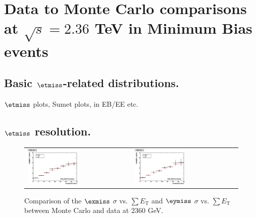 \section{Data to Monte Carlo comparisons at $\sqrt{s}=2.36$ TeV in
  Minimum Bias events}
\label{sc:DataVsMCMB2360}

\subsection{Basic $\etmiss$-related distributions.}
$\etmiss$ plots, Sumet plots, in EB/EE etc.

\clearpage

\subsection{$\etmiss$ resolution.}

\begin{figure}[h!]
 \centering
 \begin{tabular}{ll}
  \includegraphics[width=0.5\textwidth]{plots_DataVsMC_MB_2360GeV/h_metxsigma_sumet_2360.eps} &
  \includegraphics[width=0.5\textwidth]{plots_DataVsMC_MB_2360GeV/h_metysigma_sumet_2360.eps} \\
 \end{tabular}
 \caption{\small Comparison of the $\exmiss$ $\sigma$ vs. $\sum E_\text{T}$ and $\eymiss$ $\sigma$ vs. $\sum E_\text{T}$ between 
          Monte Carlo and data at $2360$ GeV.\label{fig:MExySigma_vs_SumET_2360}}
\end{figure}

